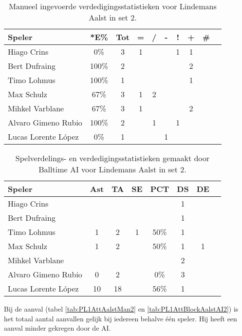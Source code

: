 \begin{table}[ht!]
  \centering
  \scriptsize
    \begin{tabular}{|l|c|c|c|c|c|c|c|c|c|}
      \hline
      \textbf{Speler} & *E\% & Tot & = & / & - & ! & + & \# \\ \hline
      Hiago Crins & 0\% & 3 & 1 &  &  & 1 & 1 &  \\ 
      Bert Dufraing & 100\% & 2 &  &  &  &  & 2 &  \\
      Timo Lohmus & 100\% & 1 &  &  &  &  & 1 &  \\
      Max Schulz & 67\% & 3 & 1 & 2 &  &  &  &  \\
      Mihkel Varblane & 67\% & 3 & 1 &  &  &  & 2 &  \\
      Alvaro Gimeno Rubio & 100\% & 2 &  & 1 &  & 1 &  &  \\
      Lucas Lorente López & 0\% & 1 &  &  & 1 &  &  &  \\ \hline
  \end{tabular}
  \caption[Manueel ingevoerde verdedigingsstatistieken voor Lindemans Aalst in set 2]{\label{tab:PL1DigAalstMan2}Manueel ingevoerde verdedigingsstatistieken voor Lindemans Aalst in set 2.}
\end{table}

\begin{table}[ht!]
  \centering
  \scriptsize
  \begin{tabular}{|l|c|c|c|c|c|c|c|} \hline
    \textbf{Speler} & Ast & TA & SE & PCT & DS & DE \\ \hline
    Hiago Crins &  &  &  &  & 1 &  \\
    Bert Dufraing &  &  &  &  & 1 &  \\ 
    Timo Lohmus & 1 & 2 & 1 & 50\% & 1 &  \\
    Max Schulz & 1 & 2 &  & 50\% & 1 & 1 \\
    Mihkel Varblane &  &  &  &  & 2 &  \\
    Alvaro Gimeno Rubio & 0 & 2 &  & 0\% & 3 &  \\
    Lucas Lorente López & 10 & 18 &  & 56\% & 1 &  \\ \hline
  \end{tabular}
  \caption[Spelverdelings- en verdedigingsstatistieken gemaakt door Balltime AI voor Lindemans Aalst in set 2]{\label{tab:PL1SetDigAalstAI2}Spelverdelings- en verdedigingsstatistieken gemaakt door Balltime AI voor Lindemans Aalst in set 2.}
\end{table}

Bij de aanval (tabel \ref{tab:PL1AttAalstMan2} en \ref{tab:PL1AttBlockAalstAI2}) is het totaal aantal aanvallen gelijk bij iedereen behalve één speler. Hij heeft een aanval minder gekregen door de AI. 

